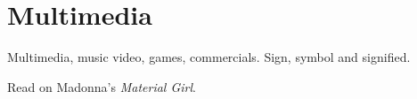 
\chapter{Multimedia}
\label{multimedia}

Multimedia, music video, games, commercials. 
Sign, symbol and signified. 

Read \citep[147-173]{cook1998analysing} on Madonna's \textit{Material Girl}.

